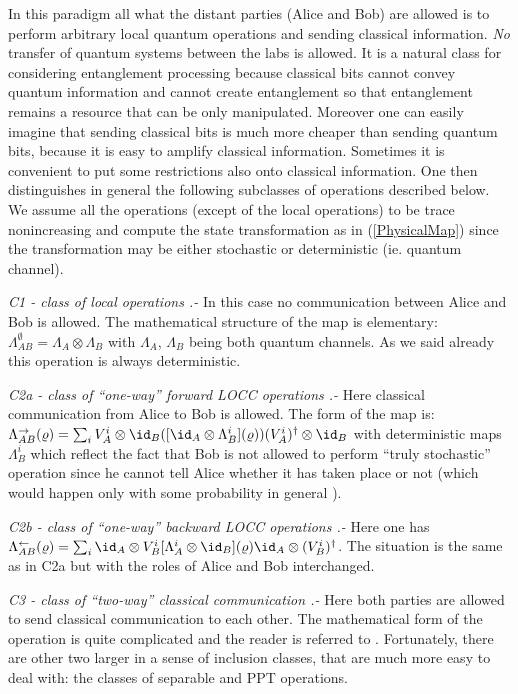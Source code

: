 \documentclass[twocolumn,aps,rmp]{revtex4}
\begin{document}
In this paradigm all what the distant parties (Alice and Bob) are allowed is
to perform arbitrary local quantum operations and sending classical
information. {\it No} transfer of quantum systems between the labs is
allowed. It is a natural class for considering entanglement processing
because classical bits cannot convey quantum information and cannot
create entanglement so that entanglement remains a resource that can
be only manipulated. Moreover one can easily imagine that sending
classical bits is much more cheaper than sending quantum bits, because
it is easy to amplify classical information. Sometimes it is
convenient to put some restrictions also onto classical
information. One then distinguishes in general the following
subclasses of operations described below. We assume all the operations
(except of the local operations) to be trace nonincreasing and compute
the state transformation as in (\ref{PhysicalMap}) since the
transformation may be either stochastic or deterministic (ie. quantum
channel).

{\it C1 - class of local operations .-} In this case no communication
between Alice and Bob is allowed. The mathematical structure of the
map is elementary: $\Lambda_{AB}^{ \emptyset}= \Lambda_{A} \otimes
\Lambda_{B}$ with $\Lambda_{A}$, $\Lambda_{B}$ being both quantum
channels. As we said already this operation is always deterministic.

{\it C2a - class of ``one-way'' forward LOCC operations .-} Here
classical communication from Alice to Bob is allowed. The
form of the map is: $\Lambda_{AB}^{\rightarrow} (\varrho)=\sum_{i}
V^{i}_{A} \otimes
 \id_{B}(
[\id_{A} \otimes \Lambda_{B}^{i}](\varrho))(V^{i}_{A})^{\dagger}
\otimes \id_{B} $ with  deterministic maps $\Lambda_{B}^{i}$ which
reflect the fact that Bob is not allowed to perform ``truly
stochastic'' operation since he cannot tell Alice whether it has
taken place or not (which would happen only with some probability in
general ).

{\it C2b - class of ``one-way'' backward LOCC operations .-}
Here one has $\Lambda_{AB}^{\leftarrow} (\varrho)=\sum_{i}\id_{A}
\otimes V^{i}_{B} [ \Lambda_{A}^{i} \otimes \id_{B}](\varrho)\id_{A}
\otimes (V^{i}_{B})^{\dagger} $. The situation is the same as in C2a
but with the roles of Alice and Bob interchanged.


{\it C3 - class of ``two-way'' classical communication .-} Here both
parties are allowed to send classical communication to each other.
The mathematical form of the operation is quite complicated and the
reader is referred to \cite{DonaldHR2001}. Fortunately, there are
other two larger in a sense of inclusion classes, that are much more
easy to deal with: the classes of separable and PPT
operations.
\end{document}
